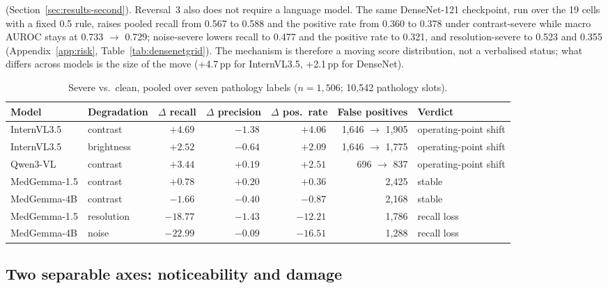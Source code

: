 (Section~\ref{sec:results-second}). Reversal~3 also does not require a language model. The same DenseNet-121 checkpoint, run over the 19 cells with a fixed 0.5 rule, raises pooled recall from 0.567 to 0.588 and the positive rate from 0.360 to 0.378 under contrast-severe while macro AUROC stays at 0.733 $\rightarrow$ 0.729; noise-severe lowers recall to 0.477 and the positive rate to 0.321, and resolution-severe to 0.523 and 0.355 (Appendix~\ref{app:risk}, Table~\ref{tab:densenetgrid}). The mechanism is therefore a moving score distribution, not a verbalised status; what differs across models is the size of the move (+4.7\,pp for InternVL3.5, +2.1\,pp for DenseNet).

\begin{table}[t]
\centering
\small
\caption{Severe vs.\ clean, pooled over seven pathology labels ($n=1{,}506$; 10,542 pathology slots).}
\label{tab:op}
\begin{tabular}{llrrrrl}
\toprule
Model & Degradation & $\Delta$ recall & $\Delta$ precision & $\Delta$ pos.\ rate & False positives & Verdict \\
\midrule
InternVL3.5 & contrast & $\mathbf{+4.69}$\,\pp{} & $-1.38$\,\pp{} & $\mathbf{+4.06}$\,\pp{} & 1,646 $\rightarrow$ 1,905 & operating-point shift \\
InternVL3.5 & brightness & $+2.52$\,\pp{} & $-0.64$\,\pp{} & $+2.09$\,\pp{} & 1,646 $\rightarrow$ 1,775 & operating-point shift \\
Qwen3-VL & contrast & $+3.44$\,\pp{} & $+0.19$\,\pp{} & $+2.51$\,\pp{} & 696 $\rightarrow$ 837 & operating-point shift \\
MedGemma-1.5 & contrast & $+0.78$\,\pp{} & $+0.20$\,\pp{} & $+0.36$\,\pp{} & 2,425 & stable \\
MedGemma-4B & contrast & $-1.66$\,\pp{} & $-0.40$\,\pp{} & $-0.87$\,\pp{} & 2,168 & stable \\
MedGemma-1.5 & resolution & $\mathbf{-18.77}$\,\pp{} & $-1.43$\,\pp{} & $-12.21$\,\pp{} & 1,786 & recall loss \\
MedGemma-4B & noise & $\mathbf{-22.99}$\,\pp{} & $-0.09$\,\pp{} & $-16.51$\,\pp{} & 1,288 & recall loss \\
\bottomrule
\end{tabular}
\end{table}

\subsection{Two separable axes: noticeability and damage}
\label{sec:results-twoaxis}

